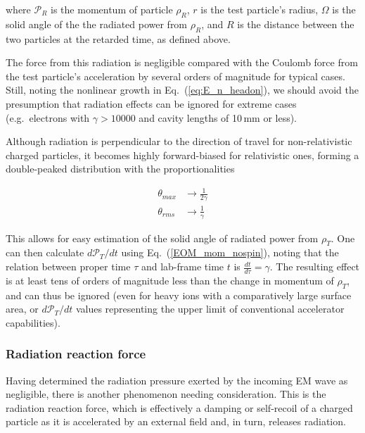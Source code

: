 \documentclass[reprint,
               amsmath,amssymb,nofootinbib, aps%
              ]{revtex4-2}
\begin{document}
\noindent where $\mathcal{P}_R$ is the momentum of particle $\rho_R$, $r$ is the test particle's radius, $\Omega$ is the solid angle of the the radiated power from $\rho_R$, and $R$ is the distance between the two particles at the retarded time, as defined above.

The force from this radiation is negligible compared with the Coulomb force from the test particle's acceleration by several orders of magnitude for typical cases. Still, noting the nonlinear growth in Eq.~(\ref{eq:E_n_headon}), we should avoid the presumption that radiation effects can be ignored for extreme cases (e.g.~electrons with $\gamma>10000$ and cavity lengths of 10\,mm or less).

Although radiation is perpendicular to the direction of travel for non-relativistic charged particles, it becomes highly forward-biased for relativistic ones, forming a double-peaked distribution with the proportionalities

\vspace{-0.2cm}
\begin{align}
    \label{radiation_max}
    \theta_{max}&\rightarrow \frac{1}{2 \gamma}
    \\
    \theta_{rms}&\rightarrow \frac{1}{\gamma}
\end{align}

This allows for easy estimation of the solid angle of radiated power from $\rho_T$. One can then calculate $d\mathcal{P}_T / dt$ using Eq.~(\ref{EOM_mom_nospin}), noting that the relation between proper time $\tau$ and lab-frame time $t$ is $\frac{dt}{d \tau}=\gamma$. The resulting effect is at least tens of orders of magnitude less than the change in momentum of $\rho_T$, and can thus be ignored (even for heavy ions with a comparatively large surface area, or $d\mathcal{P}_T / dt$ values representing the upper limit of conventional accelerator capabilities).
\vspace{-0.2cm}
\subsubsection*{Radiation reaction force}
\vspace{-0.2cm}
Having determined the radiation pressure exerted by the incoming EM wave as negligible, there is another phenomenon needing consideration. This is the radiation reaction force, which is effectively a damping or self-recoil of a charged particle as it is accelerated by an external field and, in turn, releases radiation.
\end{document}
